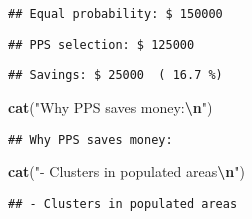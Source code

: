 \documentclass[
]{article}
\newenvironment{Shaded}{\begin{snugshade}}{\end{snugshade}}
\newcommand{\DecValTok}[1]{\textcolor[rgb]{0.00,0.00,0.81}{#1}}
\newcommand{\FunctionTok}[1]{\textcolor[rgb]{0.13,0.29,0.53}{\textbf{#1}}}
\newcommand{\NormalTok}[1]{#1}
\newcommand{\SpecialCharTok}[1]{\textcolor[rgb]{0.81,0.36,0.00}{\textbf{#1}}}
\newcommand{\StringTok}[1]{\textcolor[rgb]{0.31,0.60,0.02}{#1}}
\begin{document}
\begin{verbatim}
## Equal probability: $ 150000
\end{verbatim}

\begin{Shaded}
\end{Shaded}

\begin{verbatim}
## PPS selection: $ 125000
\end{verbatim}

\begin{Shaded}
\end{Shaded}

\begin{verbatim}
## Savings: $ 25000  ( 16.7 %)
\end{verbatim}

\begin{Shaded}
\begin{Highlighting}[]
\FunctionTok{cat}\NormalTok{(}\StringTok{"Why PPS saves money:}\SpecialCharTok{\textbackslash{}n}\StringTok{"}\NormalTok{)}
\end{Highlighting}
\end{Shaded}

\begin{verbatim}
## Why PPS saves money:
\end{verbatim}

\begin{Shaded}
\begin{Highlighting}[]
\FunctionTok{cat}\NormalTok{(}\StringTok{"{-} Clusters in populated areas}\SpecialCharTok{\textbackslash{}n}\StringTok{"}\NormalTok{)}
\end{Highlighting}
\end{Shaded}

\begin{verbatim}
## - Clusters in populated areas
\end{verbatim}
\end{document}
